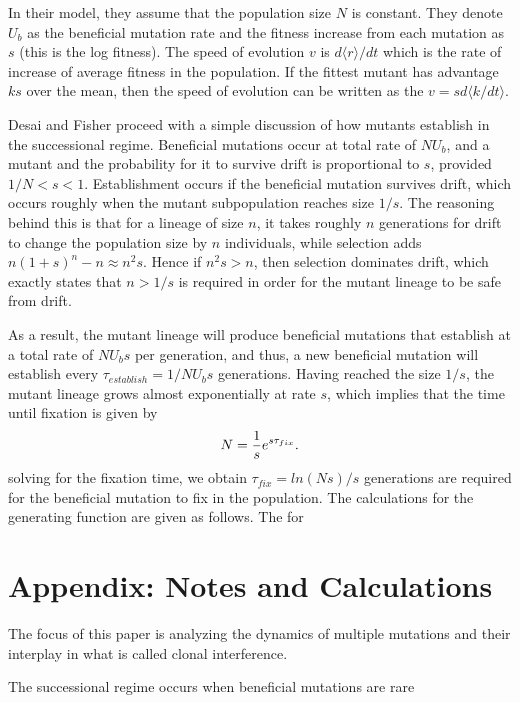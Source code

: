 \documentclass[12pt,twocolumn]{article}
\begin{document}
In their model, they assume that the population size $N$ is constant.  They denote $U_b$ as the beneficial mutation rate and the fitness increase from each   mutation as $s$ (this is the log fitness).  The speed of evolution $v$ is $d\langle r \rangle / dt$ which is the rate of increase of average fitness in the population.  If the fittest mutant has advantage $ks$ over the mean, then the speed of evolution can be written as the $v=sd\langle k  / dt \rangle$.  

Desai and Fisher proceed with a simple discussion of how mutants establish in the successional regime.  Beneficial mutations occur at total rate of $NU_b$, and a mutant and the probability for it to survive drift is proportional to $s$, provided $1/N<s<1$.  Establishment occurs if the beneficial mutation survives drift, which occurs roughly when the mutant subpopulation reaches size $1/s$.  The reasoning behind this is that for a lineage of size $n$, it takes roughly $n$ generations for drift to change the population size by $n$ individuals, while selection adds $n(1+s)^n-n \approx n^2s$.  Hence if $n^2s>n$, then selection dominates drift, which exactly states that $n>1/s$ is required in order for the mutant lineage to be safe from drift. 

As a result, the mutant lineage will produce beneficial mutations that establish at a total rate of $NU_bs$ per generation, and thus, a new beneficial mutation will establish every $\tau_{establish} = 1/NU_bs$ generations.  Having reached the size $1/s$, the mutant lineage grows almost exponentially at rate $s$, which implies that the time until fixation is given by
\[
N={1 \over s}e^{s \tau_{fix}}.
\]
solving for the fixation time, we obtain $\tau_{fix}=ln(Ns)/s$ generations are required for the beneficial mutation to fix in the population.  
The calculations for the generating function are given as follows. The for

\section*{Appendix: Notes and Calculations}
The focus of this paper is analyzing the dynamics of multiple mutations and their interplay in what is called clonal interference.  

The successional regime occurs when beneficial mutations are rare




\end{document}
